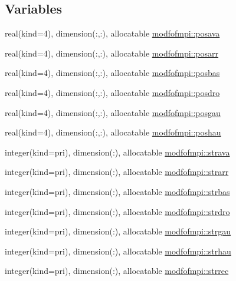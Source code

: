 \subsection*{Variables}
\begin{DoxyCompactItemize}
\item 
real(kind=4), dimension(\+:,\+:), allocatable \hyperlink{namespacemodfofmpi_a91f992ee7447a7fb3c5430233f3f39ab}{modfofmpi\+::posava}
\item 
real(kind=4), dimension(\+:,\+:), allocatable \hyperlink{namespacemodfofmpi_a240c326e64798f0d4f7fd2a785eaddfb}{modfofmpi\+::posarr}
\item 
real(kind=4), dimension(\+:,\+:), allocatable \hyperlink{namespacemodfofmpi_abd8afe0852ff1d0298955d285cb4f001}{modfofmpi\+::posbas}
\item 
real(kind=4), dimension(\+:,\+:), allocatable \hyperlink{namespacemodfofmpi_a1ca3754d2490a28a6596589818c19aba}{modfofmpi\+::posdro}
\item 
real(kind=4), dimension(\+:,\+:), allocatable \hyperlink{namespacemodfofmpi_a420a314f84492aec68a773c09730981d}{modfofmpi\+::posgau}
\item 
real(kind=4), dimension(\+:,\+:), allocatable \hyperlink{namespacemodfofmpi_a940b15087397a154e933785ff862d1aa}{modfofmpi\+::poshau}
\item 
integer(kind=pri), dimension(\+:), allocatable \hyperlink{namespacemodfofmpi_a2cc07767e1b2a2462fc2eeaaef5f5b0a}{modfofmpi\+::strava}
\item 
integer(kind=pri), dimension(\+:), allocatable \hyperlink{namespacemodfofmpi_adc11b8c24e402c222ddf9d339aece63c}{modfofmpi\+::strarr}
\item 
integer(kind=pri), dimension(\+:), allocatable \hyperlink{namespacemodfofmpi_a18f63a61d3cf10a560030f18385646d6}{modfofmpi\+::strbas}
\item 
integer(kind=pri), dimension(\+:), allocatable \hyperlink{namespacemodfofmpi_a6f52fb3f19368ce1dbad562162f6d4b5}{modfofmpi\+::strdro}
\item 
integer(kind=pri), dimension(\+:), allocatable \hyperlink{namespacemodfofmpi_a59d3a040e03ea0312701cf16ded04071}{modfofmpi\+::strgau}
\item 
integer(kind=pri), dimension(\+:), allocatable \hyperlink{namespacemodfofmpi_a9ace6e4f0b23785f3b93fe1812b07c08}{modfofmpi\+::strhau}
\item 
integer(kind=pri), dimension(\+:), allocatable \hyperlink{namespacemodfofmpi_ada00af1a25f50e826521e9b2a7ecb633}{modfofmpi\+::strrec}
\item 

\end{DoxyCompactItemize}
